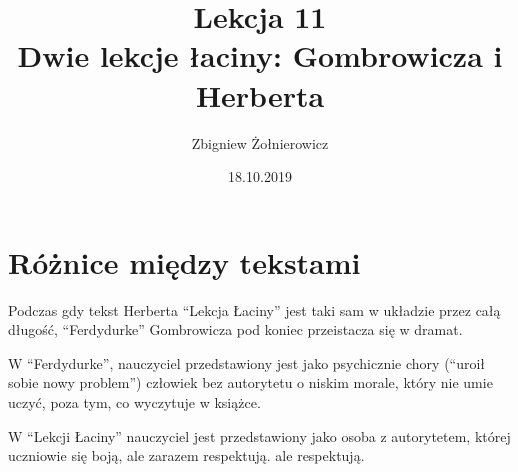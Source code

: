 \documentclass[a4paper]{article}
\begin{document}
\title{{\huge Lekcja 11} \\
{\large Dwie lekcje łaciny: Gombrowicza i Herberta}}
\author{Zbigniew Żołnierowicz}
\date{18.10.2019}
\maketitle
\section{Różnice między tekstami}
Podczas gdy tekst Herberta ``Lekcja Łaciny'' jest taki sam w układzie przez całą długość,
``Ferdydurke'' Gombrowicza pod koniec przeistacza się w dramat.

W ``Ferdydurke'', nauczyciel przedstawiony jest jako psychicznie chory (``uroił sobie nowy problem'') człowiek bez autorytetu o niskim morale,
który nie umie uczyć, poza tym, co wyczytuje w książce.

W ``Lekcji Łaciny'' nauczyciel jest przedstawiony jako osoba z autorytetem, której uczniowie się boją, ale zarazem respektują.
ale respektują.
\end{document}
